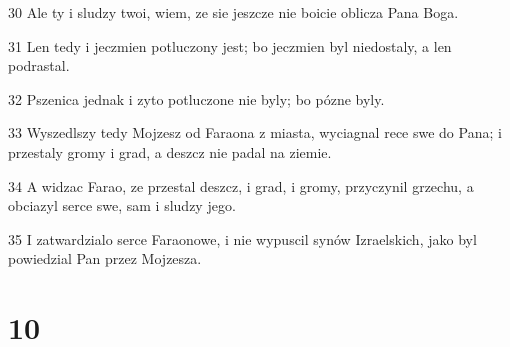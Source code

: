 \par 30 Ale ty i sludzy twoi, wiem, ze sie jeszcze nie boicie oblicza Pana Boga.
\par 31 Len tedy i jeczmien potluczony jest; bo jeczmien byl niedostaly, a len podrastal.
\par 32 Pszenica jednak i zyto potluczone nie byly; bo pózne byly.
\par 33 Wyszedlszy tedy Mojzesz od Faraona z miasta, wyciagnal rece swe do Pana; i przestaly gromy i grad, a deszcz nie padal na ziemie.
\par 34 A widzac Farao, ze przestal deszcz, i grad, i gromy, przyczynil grzechu, a obciazyl serce swe, sam i sludzy jego.
\par 35 I zatwardzialo serce Faraonowe, i nie wypuscil synów Izraelskich, jako byl powiedzial Pan przez Mojzesza.

\chapter{10}

